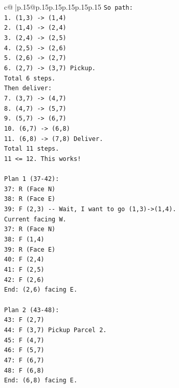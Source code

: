 \documentclass{article}
\begin{document}
{\begin{supertabular}{c@{$\;$}|p{.15\linewidth}@{}p{.15\linewidth}p{.15\linewidth}p{.15\linewidth}p{.15\linewidth}p{.15\linewidth}}
{{{\texttt{So path:} \\
\texttt{1. (1,3) {-}> (1,4)} \\
\texttt{2. (1,4) {-}> (2,4)} \\
\texttt{3. (2,4) {-}> (2,5)} \\
\texttt{4. (2,5) {-}> (2,6)} \\
\texttt{5. (2,6) {-}> (2,7)} \\
\texttt{6. (2,7) {-}> (3,7) Pickup.} \\
\texttt{Total 6 steps.} \\
\texttt{Then deliver:} \\
\texttt{7. (3,7) {-}> (4,7)} \\
\texttt{8. (4,7) {-}> (5,7)} \\
\texttt{9. (5,7) {-}> (6,7)} \\
\texttt{10. (6,7) {-}> (6,8)} \\
\texttt{11. (6,8) {-}> (7,8) Deliver.} \\
\texttt{Total 11 steps.} \\
\texttt{11 <= 12. This works!} \\
\\ 
\texttt{Plan 1 (37{-}42):} \\
\texttt{37: R (Face N)} \\
\texttt{38: R (Face E)} \\
\texttt{39: F (2,3) {-}{-} Wait, I want to go (1,3){-}>(1,4).} \\
\texttt{Current facing W.} \\
\texttt{37: R (Face N)} \\
\texttt{38: F (1,4)} \\
\texttt{39: R (Face E)} \\
\texttt{40: F (2,4)} \\
\texttt{41: F (2,5)} \\
\texttt{42: F (2,6)} \\
\texttt{End: (2,6) facing E.} \\
\\ 
\texttt{Plan 2 (43{-}48):} \\
\texttt{43: F (2,7)} \\
\texttt{44: F (3,7) Pickup Parcel 2.} \\
\texttt{45: F (4,7)} \\
\texttt{46: F (5,7)} \\
\texttt{47: F (6,7)} \\
\texttt{48: F (6,8)} \\
\texttt{End: (6,8) facing E.} \\
}}}
\end{supertabular}}
\end{document}
